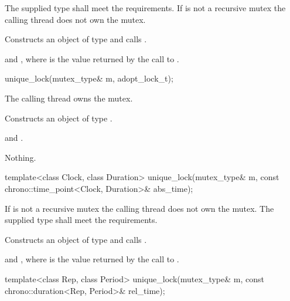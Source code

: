 \begin{itemdescr}
\pnum
\requires
The supplied  type shall meet the 
requirements.
If  is not a recursive mutex the calling thread does not own the mutex.

\pnum
\effects
Constructs an object of type  and calls .

\pnum
\ensures
{} and ,
where  is the value returned by the call to .
\end{itemdescr}

%
\begin{itemdecl}
unique_lock(mutex_type& m, adopt_lock_t);
\end{itemdecl}

\begin{itemdescr}
\pnum
\requires The calling thread owns the mutex.

\pnum
\effects
Constructs an object of type .

\pnum
\ensures
{} and .

\pnum
\throws
Nothing.
\end{itemdescr}

%
\begin{itemdecl}
template<class Clock, class Duration>
  unique_lock(mutex_type& m, const chrono::time_point<Clock, Duration>& abs_time);
\end{itemdecl}

\begin{itemdescr}
\pnum
\requires If  is not a recursive mutex the calling thread
does not own the mutex. The supplied  type shall meet the
 requirements.

\pnum
\effects
Constructs an object of type  and calls .

\pnum
\ensures
{} and ,
where  is
the value returned by the call to .
\end{itemdescr}

%
\begin{itemdecl}
template<class Rep, class Period>
  unique_lock(mutex_type& m, const chrono::duration<Rep, Period>& rel_time);
\end{itemdecl}

